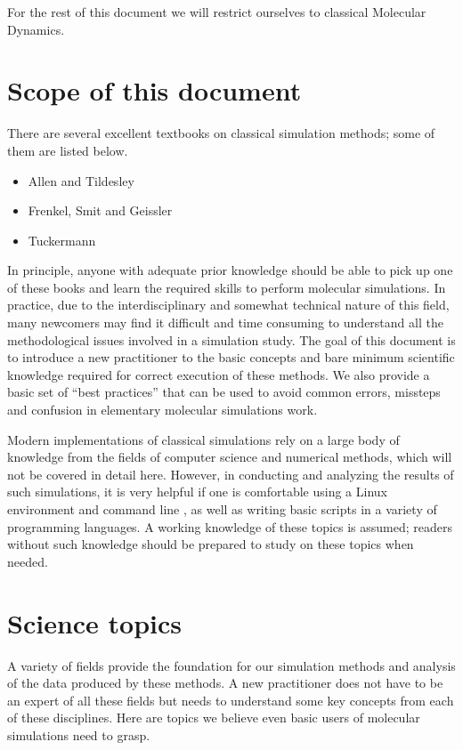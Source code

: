 \documentclass[9pt,bestpractices]{livecoms}
\begin{document}
For the rest of this document we will restrict ourselves to classical Molecular
Dynamics.

\section{Scope of this document}
\label{sec:scope}
There are several excellent textbooks on classical simulation methods; some of them are listed below.

\begin{itemize}
\item Allen and Tildesley
\item Frenkel, Smit and Geissler
\item Tuckermann
\end{itemize}

In principle, anyone with adequate prior knowledge should be able to pick up one of these books and learn the required skills to perform molecular simulations.
In practice, due to the interdisciplinary and somewhat technical nature of this field, many newcomers may find it difficult and time consuming to understand all the methodological issues involved in a simulation study.  
The goal of this document is to introduce a new practitioner to the basic concepts and bare minimum scientific knowledge required for correct execution of these methods. 
We also provide a basic set of ``best practices'' that can be used to avoid common errors, missteps and confusion in elementary molecular simulations work.

Modern implementations of classical simulations rely on a large body of knowledge from the fields of computer science and numerical methods, which will
not be covered in detail here.
However, in conducting and analyzing the results of such simulations, it is very helpful if one is comfortable using a Linux environment and command line , as well as writing basic scripts in a variety of programming languages. A working knowledge of these topics is assumed; readers without such knowledge should be prepared to study on these topics when needed.



\section{Science topics}
\label{sec:science}
A variety of fields provide the foundation for our simulation methods and analysis of the data produced by these methods.
A new practitioner does not have to be an expert of all these fields but needs to understand some key concepts from each of these disciplines.
Here are topics we believe even basic users of molecular simulations need to grasp.
\end{document}
